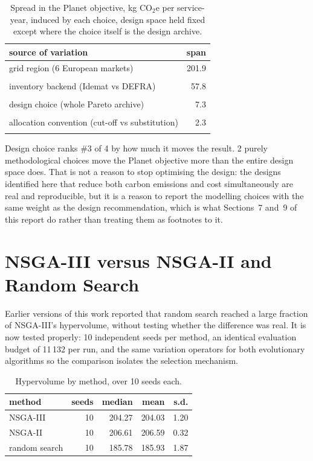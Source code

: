 \documentclass[11pt,a4paper]{article}
\begin{document}
\begin{table}[h]
\centering\small
\caption{Spread in the Planet objective, \si{\kilo\gram} CO$_2$e per
service-year, induced by each choice, design space held fixed except where
the choice itself is the design archive.}
\label{tab:spread}
\begin{tabular}{lr}
\toprule
source of variation & span \\
\midrule
grid region (6 European markets) & 201.9 \\\\
inventory backend (Idemat vs DEFRA) & 57.8 \\\\
design choice (whole Pareto archive) & 7.3 \\\\
allocation convention (cut-off vs substitution) & 2.3 \\\\
\bottomrule
\end{tabular}
\end{table}

Design choice ranks \#3 of 4 by how much it moves the
result. 2 purely methodological choices move the Planet objective more than the entire design space does. That is not a reason to stop optimising the
design: the designs identified here that reduce both carbon emissions and
cost simultaneously are real and reproducible, but it is a reason to report the modelling choices with the same weight as the
design recommendation, which is what Sections~7 and~9 of this report do rather
than treating them as footnotes to it.

\FloatBarrier
\section{NSGA-III versus NSGA-II and Random Search}

Earlier versions of this work reported that random search reached a large
fraction of NSGA-III's hypervolume, without testing whether the difference was
real. It is now tested properly: 10 independent seeds per method, an
identical evaluation budget of 11\,132 per run, and the same variation
operators for both evolutionary algorithms so the comparison isolates the
selection mechanism.

\begin{table}[h]
\centering\small
\caption{Hypervolume by method, over 10 seeds each.}
\begin{tabular}{lrrrr}
\toprule
method & seeds & median & mean & s.d. \\
\midrule
NSGA-III & 10 & 204.27 & 204.03 & 1.20 \\
NSGA-II & 10 & 206.61 & 206.59 & 0.32 \\
random search & 10 & 185.78 & 185.93 & 1.87 \\
\bottomrule
\end{tabular}
\end{table}
\end{document}
